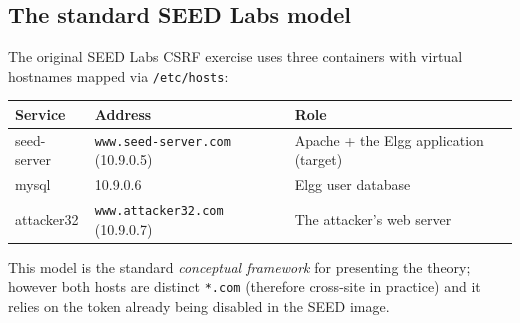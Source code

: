 \documentclass[11pt,a4paper]{article}
\begin{document}
\subsection{The standard SEED Labs model}
The original SEED Labs CSRF exercise uses three containers with virtual hostnames mapped via \texttt{/etc/hosts}:
\begin{center}\small
\begin{tabularx}{\linewidth}{@{}l l Y@{}}
\toprule
\textbf{Service} & \textbf{Address} & \textbf{Role}\\
\midrule
seed-server & \texttt{www.seed-server.com} (10.9.0.5) & Apache + the Elgg application (target)\\
mysql       & 10.9.0.6 & Elgg user database\\
attacker32  & \texttt{www.attacker32.com} (10.9.0.7) & The attacker's web server\\
\bottomrule
\end{tabularx}
\end{center}
\noindent This model is the standard \emph{conceptual framework} for presenting the theory; however both hosts are distinct \texttt{*.com} (therefore cross-site in practice) and it relies on the token already being disabled in the SEED image.
\end{document}
